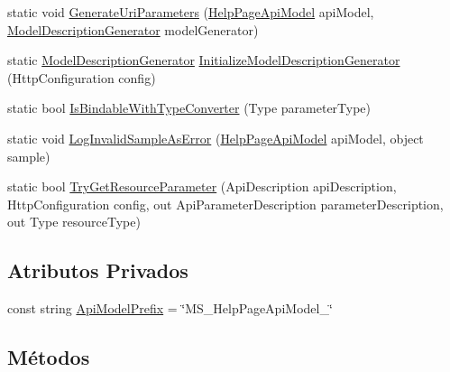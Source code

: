 \begin{DoxyCompactItemize}
\item 
static void \hyperlink{classApi3Layers_1_1Areas_1_1HelpPage_1_1HelpPageConfigurationExtensions_af3b2401673b568e9a8db7b2627fc031d}{Generate\+Uri\+Parameters} (\hyperlink{classApi3Layers_1_1Areas_1_1HelpPage_1_1Models_1_1HelpPageApiModel}{Help\+Page\+Api\+Model} api\+Model, \hyperlink{classApi3Layers_1_1Areas_1_1HelpPage_1_1ModelDescriptions_1_1ModelDescriptionGenerator}{Model\+Description\+Generator} model\+Generator)
\item 
static \hyperlink{classApi3Layers_1_1Areas_1_1HelpPage_1_1ModelDescriptions_1_1ModelDescriptionGenerator}{Model\+Description\+Generator} \hyperlink{classApi3Layers_1_1Areas_1_1HelpPage_1_1HelpPageConfigurationExtensions_a16f47e8aa323c09cd0cf32e89db952bf}{Initialize\+Model\+Description\+Generator} (Http\+Configuration config)
\item 
static bool \hyperlink{classApi3Layers_1_1Areas_1_1HelpPage_1_1HelpPageConfigurationExtensions_a732c7e4cbb02fe025f256f3d4474b914}{Is\+Bindable\+With\+Type\+Converter} (Type parameter\+Type)
\item 
static void \hyperlink{classApi3Layers_1_1Areas_1_1HelpPage_1_1HelpPageConfigurationExtensions_ab46e5f234a0f063dfaf277f77ddee2f6}{Log\+Invalid\+Sample\+As\+Error} (\hyperlink{classApi3Layers_1_1Areas_1_1HelpPage_1_1Models_1_1HelpPageApiModel}{Help\+Page\+Api\+Model} api\+Model, object sample)
\item 
static bool \hyperlink{classApi3Layers_1_1Areas_1_1HelpPage_1_1HelpPageConfigurationExtensions_ad4d11c54254ca636a77a9cc8aef8c46e}{Try\+Get\+Resource\+Parameter} (Api\+Description api\+Description, Http\+Configuration config, out Api\+Parameter\+Description parameter\+Description, out Type resource\+Type)
\end{DoxyCompactItemize}
\subsection*{Atributos Privados}
\begin{DoxyCompactItemize}
\item 
const string \hyperlink{classApi3Layers_1_1Areas_1_1HelpPage_1_1HelpPageConfigurationExtensions_a04d4e06a2bc79e7cf9f3acb633928c3a}{Api\+Model\+Prefix} = \char`\"{}M\+S\+\_\+\+Help\+Page\+Api\+Model\+\_\+\char`\"{}
\end{DoxyCompactItemize}


\subsection{Métodos}
\mbox{\label{classApi3Layers_1_1Areas_1_1HelpPage_1_1HelpPageConfigurationExtensions_ab6eed27114a1a255723fa4ab8a65586d}} 
